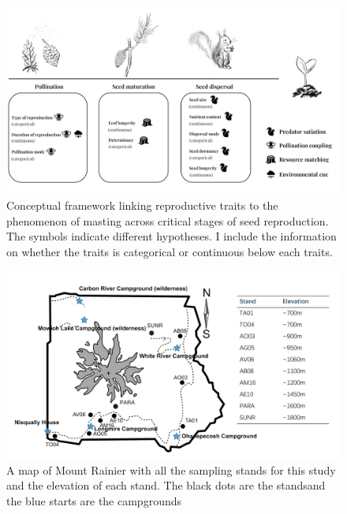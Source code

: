 \documentclass[11pt,letter]{article}
\begin{document}
\begin{figure}[htb]
	\centering
	\includegraphics[width=1\linewidth]{conceptualChap1.png}
	\caption{Conceptual framework linking reproductive traits to the phenomenon of masting across critical stages of seed reproduction. The symbols indicate different hypotheses. I include the information on whether the traits is categorical or continuous below each traits.}
	\label{fig:conceptual1}
\end{figure}
\begin{figure}[htb]
	\centering
	\includegraphics[width=1\linewidth]{rainierMap.png}
	\caption{A map of Mount Rainier with all the sampling stands for this study and the elevation of each stand. The black dots are the standsand the blue starts are the campgrounds}
	\label{fig:sites}
\end{figure}
\end{document}
